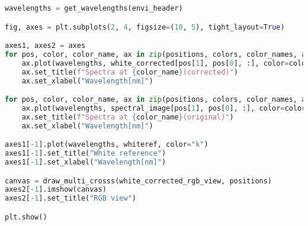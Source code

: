 \begin{lstlisting}[language=python, caption=White correction for SpecimIQ with small reference, label={code:wc-specimiq-small}]
wavelengths = get_wavelengths(envi_header)

fig, axes = plt.subplots(2, 4, figsize=(10, 5), tight_layout=True)

axes1, axes2 = axes
for pos, color, color_name, ax in zip(positions, colors, color_names, axes2):
    ax.plot(wavelengths, white_corrected[pos[1], pos[0], :], color=color)
    ax.set_title(f"Spectra at {color_name}(corrected)")
    ax.set_xlabel("Wavelength[nm]")

for pos, color, color_name, ax in zip(positions, colors, color_names, axes1):
    ax.plot(wavelengths, spectral_image[pos[1], pos[0], :], color=color)
    ax.set_title(f"Spectra at {color_name}(original)")
    ax.set_xlabel("Wavelength[nm]")

axes1[-1].plot(wavelengths, whiteref, color="k")
axes1[-1].set_title("White reference")
axes1[-1].set_xlabel("Wavelength[nm]")

canvas = draw_multi_crosss(white_corrected_rgb_view, positions)
axes2[-1].imshow(canvas)
axes2[-1].set_title("RGB view")

plt.show()

\end{lstlisting}
